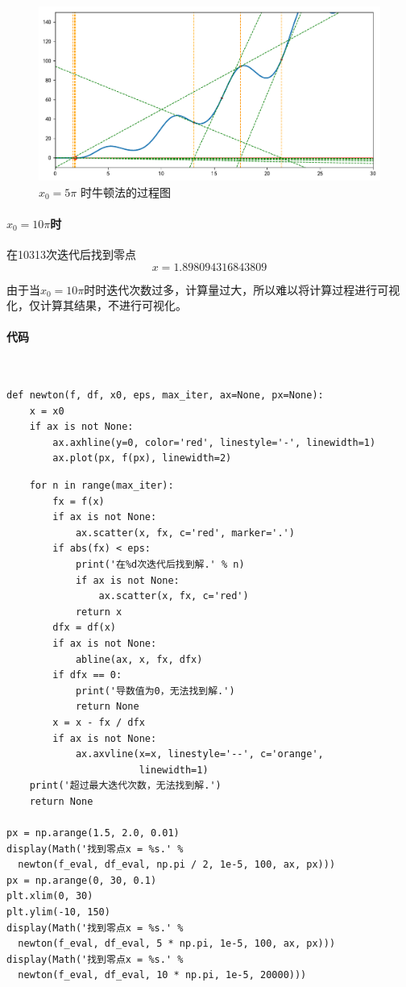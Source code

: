 \begin{figure}[H]
	\centering
	\caption{$x_0 = 5\pi$ 时牛顿法的过程图}
	\includegraphics[width=\linewidth]{fig7.pdf}
\end{figure}

\paragraph{$x_0=10\pi$时} 在10313次迭代后找到零点\[x = 1.898094316843809\]

由于当$x_0=10\pi$时时迭代次数过多，计算量过大，所以难以将计算过程进行可视化，仅计算其结果，不进行可视化。

\paragraph{代码}
~\\
\begin{verbatim}
def newton(f, df, x0, eps, max_iter, ax=None, px=None):
    x = x0
    if ax is not None:
        ax.axhline(y=0, color='red', linestyle='-', linewidth=1)
        ax.plot(px, f(px), linewidth=2)
\end{verbatim}
\begin{verbatim}
    for n in range(max_iter):
        fx = f(x)
        if ax is not None:
            ax.scatter(x, fx, c='red', marker='.')
        if abs(fx) < eps:
            print('在%d次迭代后找到解.' % n)
            if ax is not None:
                ax.scatter(x, fx, c='red')
            return x
        dfx = df(x)
        if ax is not None:
            abline(ax, x, fx, dfx)
        if dfx == 0:
            print('导数值为0，无法找到解.')
            return None
        x = x - fx / dfx
        if ax is not None:
            ax.axvline(x=x, linestyle='--', c='orange', 
                       linewidth=1)
    print('超过最大迭代次数，无法找到解.')
    return None
    
px = np.arange(1.5, 2.0, 0.01)
display(Math('找到零点x = %s.' % 
  newton(f_eval, df_eval, np.pi / 2, 1e-5, 100, ax, px)))
px = np.arange(0, 30, 0.1)
plt.xlim(0, 30)
plt.ylim(-10, 150)
display(Math('找到零点x = %s.' %
  newton(f_eval, df_eval, 5 * np.pi, 1e-5, 100, ax, px)))
display(Math('找到零点x = %s.' %
  newton(f_eval, df_eval, 10 * np.pi, 1e-5, 20000)))
\end{verbatim}

